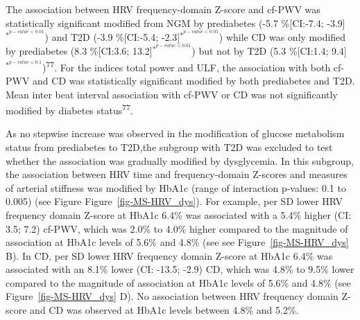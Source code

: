 \documentclass[
  a4paper,
  headsepline=true,
  open=left]{scrbook}
\begin{document}
The association between HRV frequency-domain Z-score and cf-PWV was
statistically significant modified from NGM by prediabetes (-5.7
\%{[}CI:-7.4; -3.9{]}\(^{*^{p-value< 0.01}}\)) and T2D (-3.9
\%{[}CI:-5.4; -2.3{]}\(^{*^{p-value< 0.05}}\)) while CD was only
modified by prediabetes (8.3 \%{[}CI:3.6;
13.2{]}\(^{*^{p-value< 0.01}}\)) but not by T2D (5.3 \%{[}CI:1.4;
9.4{]}\(^{*^{p-value< 0.1}}\))\textsuperscript{77}. For the indices
total power and ULF, the association with both cf-PWV and CD was
statistically significant modified by both prediabetes and T2D. Mean
inter beat interval association with cf-PWV or CD was not significantly
modified by diabetes status\textsuperscript{77}.

As no stepwise increase was observed in the modification of glucose
metabolism status from prediabetes to T2D,the subgroup with T2D was
excluded to test whether the association was gradually modified by
dysglycemia. In this subgroup, the association between HRV time and
frequency-domain Z-scores and measures of arterial stiffness was
modified by HbA1c (range of interaction p-values: 0.1 to 0.005) (see
Figure Figure~\ref{fig-MS-HRV_dys}). For example, per SD lower HRV
frequency domain Z-score at HbA1c 6.4\% was associated with a 5.4\%
higher (CI: 3.5; 7.2) cf-PWV, which was 2.0\% to 4.0\% higher compared
to the magnitude of association at HbA1c levels of 5.6\% and 4.8\% (see
see Figure~\ref{fig-MS-HRV_dys} B). In CD, per SD lower HRV frequency
domain Z-score at HbA1c 6.4\% was associated with an 8.1\% lower (CI:
-13.5; -2.9) CD, which was 4.8\% to 9.5\% lower compared to the
magnitude of association at HbA1c levels of 5.6\% and 4.8\% (see
Figure~\ref{fig-MS-HRV_dys} D). No association between HRV frequency
domain Z-score and CD was observed at HbA1c levels between 4.8\% and
5.2\%.

\end{document}
